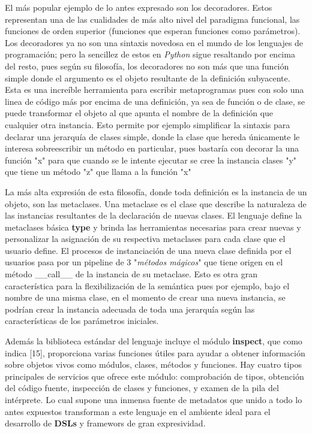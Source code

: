El más popular ejemplo de lo antes expresado son los decoradores. Estos representan una de las
cualidades de más alto nivel del paradigma funcional, las funciones de orden superior (funciones
que esperan funciones como parámetros). Los decoradores ya no son una sintaxis novedosa en el
mundo de los lenguajes de programación; pero la sencillez de estos en {\it Python} sigue resaltando
por encima del resto, pues según su filosofía, los decoradores no son más que una función
simple donde el argumento es el objeto resultante de la definición subyacente. Esta es una
increíble herramienta para escribir metaprogramas pues con solo una linea de código más por
encima de una definición, ya sea de función o de clase, se puede transformar el objeto al que
apunta el nombre de la definición que cualquier otra instancia. Esto permite por ejemplo
simplificar la sintaxis para declarar una jerarquía de clases simple, donde la clase que hereda
únicamente le interesa sobreescribir un método en particular, pues bastaría con decorar la
una función "x" para que cuando se le intente ejecutar se cree la instancia clases "y"
que tiene un método "z" que llama a la función "x"

La más alta expresión de esta filosofía, donde toda definición es la instancia de un objeto,
son las metaclases. Una metaclase es el clase que describe la naturaleza de las instancias
resultantes de la declaración de nuevas clases. El lenguaje define la metaclases básica
{\bf type} y brinda las herramientas necesarias para crear nuevas y personalizar la asignación
de su respectiva metaclases para cada clase que el usuario define. El procesos de instanciación
de una nueva clase definida por el usuarios pasa por un pipeline de 3 "{\it métodos mágicos}" que
tiene origen en el método \_\_call\_\_ de la instancia de su metaclase. Esto es otra gran
característica para la flexibilización de la semántica pues por ejemplo, bajo el nombre de una
misma clase, en el momento de crear una nueva instancia, se podrían crear la instancia adecuada
de toda una jerarquía según las características de los parámetros iniciales.

Además la biblioteca estándar del lenguaje incluye el módulo {\bf inspect}, que como indica [15],
proporciona varias funciones útiles para ayudar a obtener información sobre objetos vivos
como módulos, clases, métodos y funciones. Hay cuatro tipos principales de servicios que ofrece
este módulo: comprobación de tipos, obtención del código fuente, inspección de clases y funciones,
y examen de la pila del intérprete. Lo cual supone una inmensa fuente de metadatos que unido
a todo lo antes expuestos transforman a este lenguaje en el ambiente ideal para el desarrollo de
      {\bf DSLs} y framewors de gran expresividad.

